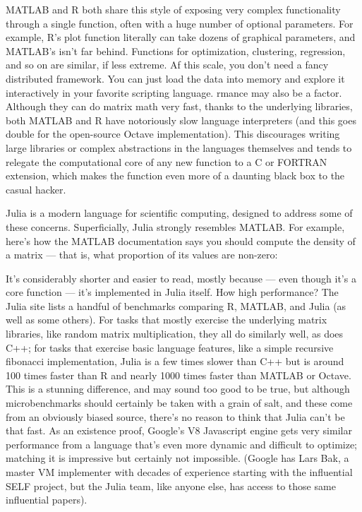 MATLAB and R both share this style of exposing very complex functionality through a single function, often with a huge number of optional parameters. For example, R’s plot function literally can take dozens of graphical parameters, and MATLAB’s isn’t far behind. Functions for optimization, clustering, regression, and so on are similar, if less extreme. 
Af this scale, you don’t need a fancy distributed framework. You can just load the data into memory and explore it interactively in your favorite scripting language.
rmance may also be a factor. Although they can do matrix math very fast, thanks to the underlying libraries, both MATLAB and R have notoriously slow language interpreters (and this goes double for the open-source Octave implementation). This discourages writing large libraries or complex abstractions in the languages themselves and tends to relegate the computational core of any new function to a C or FORTRAN extension, which makes the function even more of a daunting black box to the casual hacker.

Julia is a modern language for scientific computing, designed to address some of these concerns. Superficially, Julia strongly resembles MATLAB. For example, here’s how the MATLAB documentation says you should compute the density of a matrix — that is, what proportion of its values are non-zero:

It’s considerably shorter and easier to read, mostly because — even though it’s a core function — it’s implemented in Julia itself.
How high performance? The Julia site lists a handful of benchmarks comparing R, MATLAB, and Julia (as well as some others). For tasks that mostly exercise the underlying matrix libraries, like random matrix multiplication, they all do similarly well, as does C++; for tasks that exercise basic language features, like a simple recursive fibonacci implementation, Julia is a few times slower than C++ but is around 100 times faster than R and nearly 1000 times faster than MATLAB or Octave. This is a stunning difference, and may sound too good to be true, but although microbenchmarks should certainly be taken with a grain of salt, and these come from an obviously biased source, there’s no reason to think that Julia can’t be that fast. As an existence proof, Google’s V8 Javascript engine gets very similar performance from a language that’s even more dynamic and difficult to optimize; matching it is impressive but certainly not impossible. (Google has Lars Bak, a master VM implementer with decades of experience starting with the influential SELF project, but the Julia team, like anyone else, has access to those same influential papers).

